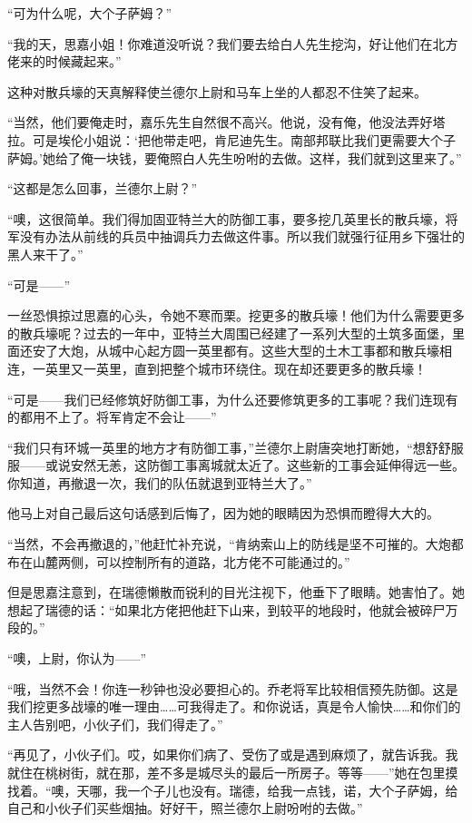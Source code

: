 \par “可为什么呢，大个子萨姆？”
\par “我的天，思嘉小姐！你难道没听说？我们要去给白人先生挖沟，好让他们在北方佬来的时候藏起来。”
\par 这种对散兵壕的天真解释使兰德尔上尉和马车上坐的人都忍不住笑了起来。
\par “当然，他们要俺走时，嘉乐先生自然很不高兴。他说，没有俺，他没法弄好塔拉。可是埃伦小姐说：‘把他带走吧，肯尼迪先生。南部邦联比我们更需要大个子萨姆。’她给了俺一块钱，要俺照白人先生吩咐的去做。这样，我们就到这里来了。”
\par “这都是怎么回事，兰德尔上尉？”
\par “噢，这很简单。我们得加固亚特兰大的防御工事，要多挖几英里长的散兵壕，将军没有办法从前线的兵员中抽调兵力去做这件事。所以我们就强行征用乡下强壮的黑人来干了。”
\par “可是——”
\par 一丝恐惧掠过思嘉的心头，令她不寒而栗。挖更多的散兵壕！他们为什么需要更多的散兵壕呢？过去的一年中，亚特兰大周围已经建了一系列大型的土筑多面堡，里面还安了大炮，从城中心起方圆一英里都有。这些大型的土木工事都和散兵壕相连，一英里又一英里，直到把整个城市环绕住。现在却还要更多的散兵壕！
\par “可是——我们已经修筑好防御工事，为什么还要修筑更多的工事呢？我们连现有的都用不上了。将军肯定不会让——”
\par “我们只有环城一英里的地方才有防御工事，”兰德尔上尉唐突地打断她，“想舒舒服服——或说安然无恙，这防御工事离城就太近了。这些新的工事会延伸得远一些。你知道，再撤退一次，我们的队伍就退到亚特兰大了。”
\par 他马上对自己最后这句话感到后悔了，因为她的眼睛因为恐惧而瞪得大大的。
\par “当然，不会再撤退的，”他赶忙补充说，“肯纳索山上的防线是坚不可摧的。大炮都布在山麓两侧，可以控制所有的道路，北方佬不可能通过的。”
\par 但是思嘉注意到，在瑞德懒散而锐利的目光注视下，他垂下了眼睛。她害怕了。她想起了瑞德的话：“如果北方佬把他赶下山来，到较平的地段时，他就会被碎尸万段的。”
\par “噢，上尉，你认为——”
\par “哦，当然不会！你连一秒钟也没必要担心的。乔老将军比较相信预先防御。这是我们挖更多战壕的唯一理由……可我得走了。和你说话，真是令人愉快……和你们的主人告别吧，小伙子们，我们得走了。”
\par “再见了，小伙子们。哎，如果你们病了、受伤了或是遇到麻烦了，就告诉我。我就住在桃树街，就在那，差不多是城尽头的最后一所房子。等等——”她在包里摸找着。“噢，天哪，我一个子儿也没有。瑞德，给我一点钱，诺，大个子萨姆，给自己和小伙子们买些烟抽。好好干，照兰德尔上尉吩咐的去做。”
